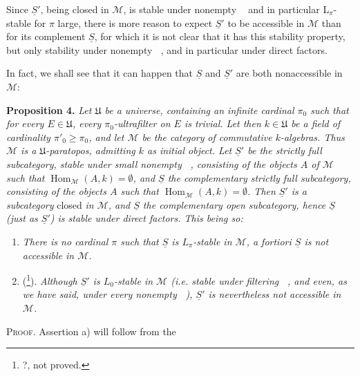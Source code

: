 \documentclass[11pt]{article}
\newcommand{\printedpage}[1]{\marginpar{\footnotesize p.~#1}}
\newcommand{\msp}[1]{\marginpar{\footnotesize [#1]}}
\newcommand{\limind}{\mathop{\underrightarrow{\mathrm{lim}}}}
\newcommand{\limproj}{\mathop{\underleftarrow{\mathrm{lim}}}}
\begin{document}
Since $\underline{S}'$, being closed in $\mathcal{M}$, is stable under nonempty $\limind$ and in particular $\mathrm{L}_\pi$-stable for $\pi$ large, there is more reason to expect $\underline{S}'$ to be accessible in $\mathcal{M}$ than for its complement $\underline{S}$, for which it is not clear that it has this stability property, but only stability under nonempty $\limproj$, and in particular under direct factors.

In fact, we shall see that it can happen that $\underline{S}$ and $\underline{S}'$ are both nonaccessible in $\mathcal{M}$:

\textbf{Proposition 4.} \textit{Let $\mathfrak{U}$ be a universe, containing an infinite cardinal $\pi_0$ such that for every $E\in\mathfrak{U}$, every $\pi_0$-ultrafilter on $E$ is trivial. Let then $k\in\mathfrak{U}$ be a field of cardinality $\pi'_0\geqslant\pi_0$, and let $\mathcal{M}$ be the category}
\printedpage{197}
\msp{page 14}
\textit{of commutative $k$-algebras. Thus $\mathcal{M}$ is a $\mathfrak{U}$-paratopos, admitting $k$ as initial object. Let $\underline{S}'$ be the strictly full subcategory, stable under small nonempty $\limind$, consisting of the objects $A$ of $\mathcal{M}$ such that $\operatorname{Hom}_{\mathcal{M}}(A,k)=\emptyset$, and $\underline{S}$ the complementary strictly full subcategory, consisting of the objects $A$ such that $\operatorname{Hom}_{\mathcal{M}}(A,k)=\emptyset$. Then $\underline{S}'$ is a subcategory} closed \textit{in $\mathcal{M}$, and $\underline{S}$ the complementary open subcategory, hence $\underline{S}$ (just as $\underline{S}'$) is stable under direct factors. This being so:} %
\begin{enumerate}[label={}]
\item[\textit{a)}] \textit{There is no cardinal $\pi$ such that $\underline{S}$ is $L_\pi$-stable in $\mathcal{M}$, a fortiori $\underline{S}$ is not accessible in $\mathcal{M}$.}
\item[\textit{b)}] (\footnote[207]{?, not proved.}). \textit{Although $\underline{S}'$ is $L_0$-stable in $\mathcal{M}$ (i.e. stable under filtering $\limind$, and even, as we have said, under every nonempty $\limind$), $\underline{S}'$ is nevertheless not accessible in $\mathcal{M}$.}
\end{enumerate}
\noindent\textsc{Proof}. Assertion a) will follow from the
\end{document}
